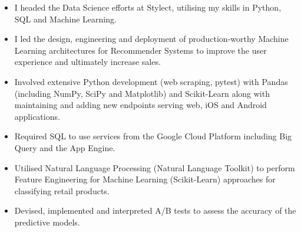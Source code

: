 \documentclass[11pt,a4paper,sans]{moderncv}        %
\begin{document}
{
\begin{itemize}%
\item I headed the Data Science efforts at Stylect, utilising my skills in Python, SQL and Machine Learning.
\item I led the design, engineering and deployment of production-worthy Machine Learning architectures for Recommender Systems to improve the user experience and ultimately increase sales.
\item Involved extensive Python development (web scraping, pytest) with Pandas (including NumPy, SciPy and Matplotlib) and Scikit-Learn along with maintaining and adding new  endpoints serving web, iOS and Android applications.
\item Required SQL to use services from the Google Cloud Platform including Big Query and the App Engine.
\item Utilised Natural Language Processing (Natural Language Toolkit) to perform Feature Engineering for Machine Learning (Scikit-Learn) approaches for classifying retail products.
\item Devised, implemented and interpreted A/B tests to assess the accuracy of the predictive models.
\end{itemize}
}
\vspace*{-0.15cm}
\vspace*{-0.15cm}
\end{document}
